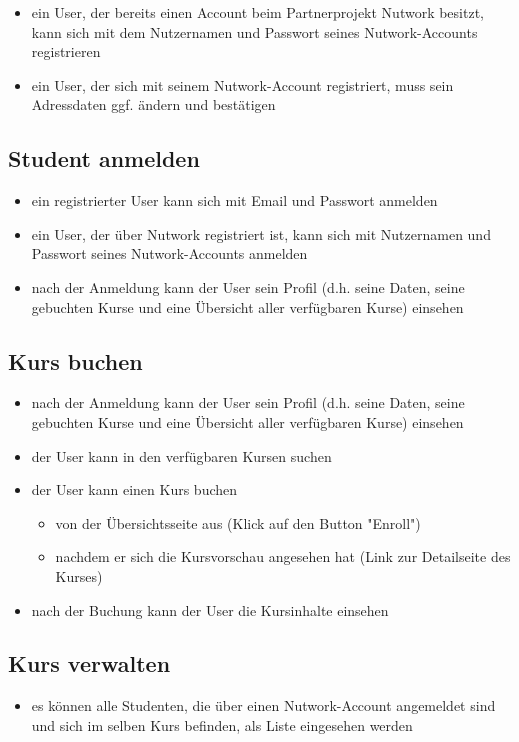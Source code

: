 \documentclass{article}
\begin{document}
\begin{itemize}
\item ein User, der bereits einen Account beim Partnerprojekt Nutwork besitzt, kann sich mit dem Nutzernamen und Passwort seines Nutwork-Accounts registrieren
\item ein User, der sich mit seinem Nutwork-Account registriert, muss sein Adressdaten ggf. \"andern und best\"atigen
\end{itemize}

\subsection{Student anmelden}

\begin{itemize}
\item ein registrierter User kann sich mit Email und Passwort anmelden
\item ein User, der \"uber Nutwork registriert ist, kann sich mit Nutzernamen und Passwort seines Nutwork-Accounts anmelden
\item nach der Anmeldung kann der User sein Profil (d.h. seine Daten, seine gebuchten Kurse und eine \"Ubersicht aller verf\"ugbaren Kurse) einsehen
\end{itemize}

\subsection{Kurs buchen}

\begin{itemize}
\item nach der Anmeldung kann der User sein Profil (d.h. seine Daten, seine gebuchten Kurse und eine \"Ubersicht aller verf\"ugbaren Kurse) einsehen
\item der User kann in den verf\"ugbaren Kursen suchen
\item der User kann einen Kurs buchen
	\begin{itemize}
	\item von der \"Ubersichtsseite aus (Klick auf den Button "Enroll")
	\item nachdem er sich die Kursvorschau angesehen hat (Link zur Detailseite des Kurses)
	\end{itemize}
\item nach der Buchung kann der User die Kursinhalte einsehen
\end{itemize}

\subsection{Kurs verwalten}

\begin{itemize}
\item es k\"onnen alle Studenten, die \"uber einen Nutwork-Account angemeldet sind und sich im selben Kurs befinden, als Liste eingesehen werden
\end{itemize}
\end{document}
